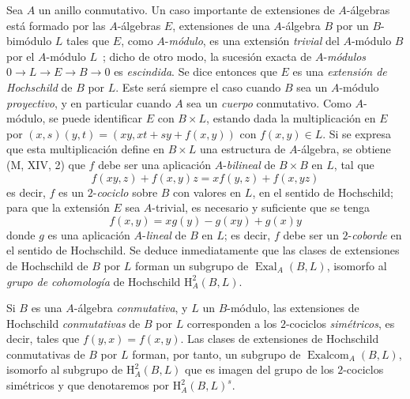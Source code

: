 \begin{env}[18.4.3]
\label{0.18.4.3-es}
Sea $A$ un anillo conmutativo. Un caso importante de extensiones de
$A$-álgebras está formado por las $A$-álgebras $E$, extensiones de una $A$-álgebra $B$
por un $B$-bimódulo $L$ tales que $E$, como $A$-\emph{módulo}, es una
extensión \emph{trivial} del $A$-módulo $B$ por el $A$-módulo $L$~; dicho de otro
modo, la sucesión exacta de $A$-\emph{módulos}
$0\to L\to E\to B\to0$ es \emph{escindida}. Se dice entonces que $E$ es una
\emph{extensión de Hochschild} de $B$ por $L$. Este será siempre el caso cuando
$B$ sea un $A$-módulo \emph{proyectivo}, y en particular cuando $A$ sea un
\emph{cuerpo} conmutativo. Como $A$-módulo, se puede identificar $E$ con
$B\times L$, estando dada la multiplicación en $E$ por
$(x,s)(y,t)=(xy,xt+sy+f(x,y))$ con $f(x,y)\in L$. Si se expresa que esta
multiplicación define en $B\times L$ una estructura de $A$-álgebra, se obtiene
(M, XIV, 2) que $f$ debe ser una aplicación $A$-\emph{bilineal} de
$B\times B$ en $L$, tal que
\begin{equation}
\label{0.18.4.3.1-es}
\tag{18.4.3.1}
  f(xy,z)+f(x,y)z=xf(y,z)+f(x,yz)
\end{equation}
es decir, $f$ es un $2$-\emph{cociclo} sobre $B$ con valores en $L$, en el
sentido de Hochschild; para que la extensión $E$ sea $A$-trivial, es necesario
y suficiente que se tenga
\begin{equation}
\label{0.18.4.3.2-es}
\tag{18.4.3.2}
  f(x,y)=xg(y)-g(xy)+g(x)y
\end{equation}
donde $g$ es una aplicación $A$-\emph{lineal} de $B$ en $L$; es decir, $f$
debe ser un $2$-\emph{coborde} en el sentido de Hochschild. Se deduce
inmediatamente que las clases de extensiones de Hochschild de $B$ por $L$
forman un subgrupo de $\operatorname{Exal}_A(B,L)$, isomorfo al \emph{grupo de
cohomología} de Hochschild $\mathrm H_A^2(B,L)$.

Si $B$ es una $A$-álgebra \emph{conmutativa}, y $L$ un $B$-módulo, las
extensiones de Hochschild \emph{conmutativas} de $B$ por $L$ corresponden a los
$2$-cociclos \emph{simétricos}, es decir, tales que $f(y,x)=f(x,y)$. Las clases
de extensiones de Hochschild conmutativas de $B$ por $L$ forman, por tanto, un
subgrupo de $\operatorname{Exalcom}_A(B,L)$, isomorfo al subgrupo de
$\mathrm H_A^2(B,L)$ que es imagen del grupo de los $2$-cociclos simétricos y
que denotaremos por $\mathrm H_A^2(B,L)^s$.
\end{env}

